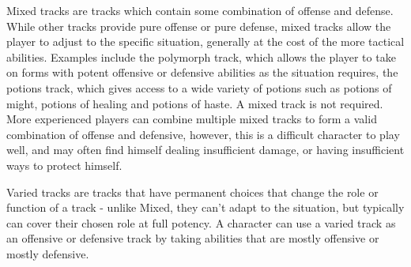 \begin{multicols*}{2}
Mixed tracks are tracks which contain some combination of offense and defense. While other tracks provide pure offense or pure defense, mixed tracks allow the player to adjust to the specific situation, generally at the cost of the more tactical abilities. Examples include the polymorph track, which allows the player to take on forms with potent offensive or defensive abilities as the situation requires, the potions track, which gives access to a wide variety of potions such as potions of might, potions of healing and potions of haste. A mixed track is not required. More experienced players can combine multiple mixed tracks to form a valid combination of offense and defensive, however, this is a difficult character to play well, and may often find himself dealing insufficient damage, or having insufficient ways to protect himself.

Varied tracks are tracks that have permanent choices that change the role or function of a track - unlike Mixed, they can’t adapt to the situation, but typically can cover their chosen role at full potency. A character can use a varied track as an offensive or defensive track by taking abilities that are mostly offensive or mostly defensive.

\end{multicols*}











